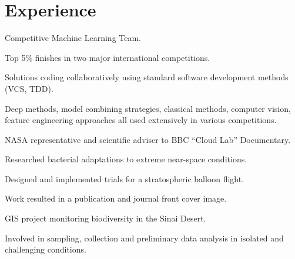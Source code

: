 \documentclass[]{Finlay_Maguire_CV}
\begin{document}
\begin{minipage}[t]{0.66\textwidth} 


\section{Experience}
\sectionsep

\vspace{\topsep} %
\begin{tightemize}
\item Competitive Machine Learning Team.
\item Top 5\% finishes in two major international competitions.
\item Solutions coding collaboratively using standard software development methods (VCS, TDD).
\item Deep methods, model combining strategies, classical methods, computer vision, feature engineering approaches all used extensively in various competitions.
\end{tightemize}
\sectionsep

\begin{tightemize}
\item NASA representative and scientific adviser to BBC ``Cloud Lab'' Documentary.
\item Researched bacterial adaptations to extreme near-space conditions.
\item Designed and implemented trials for a stratospheric balloon flight.
\item Work resulted in a publication and journal front cover image.
\end{tightemize}
\sectionsep

\begin{tightemize}
\item GIS project monitoring biodiversity in the Sinai Desert.
\item Involved in sampling, collection and preliminary data analysis in isolated and challenging conditions.
\end{tightemize}
\sectionsep


\end{minipage}
\end{document}
